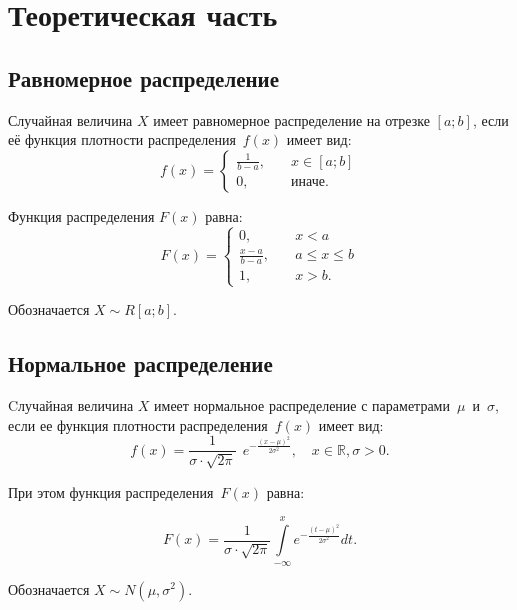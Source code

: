 \chapter{Теоретическая часть}

\section{Равномерное распределение}

Случайная величина $X$ имеет равномерное распределение на отрезке $[a; b]$, если её функция плотности распределения~$f(x)$ имеет вид:
\begin{equation}
	f(x) =
	\begin{cases}
		\frac{1}{b - a}, & \quad x \in [a; b]\\
		0,  & \quad \text{иначе}.
	\end{cases}
\end{equation}

Функция распределения $F(x)$ равна:
\begin{equation}
	F(x) =
	\begin{cases}
		0, & \quad x < a \\
		\frac{x - a}{b - a}, & \quad a \le x \le b \\
		1,  & \quad x > b.
	\end{cases}
\end{equation}

Обозначается $X \sim R[a; b]$.

\section{Нормальное распределение}

Cлучайная величина $X$ имеет нормальное распределение с параметрами~$\mu$~и~$\sigma$, если ее функция плотности распределения~$f(x)$ имеет вид:
\begin{equation}
	f(x) = \frac{1}{\sigma \cdot \sqrt{2\pi}}~~e^{\displaystyle-\frac{(x -
			\mu)^2}{2\sigma^2}}, \quad x \in \mathbb{R}, \sigma > 0.
\end{equation}

При этом функция распределения~$F(x)$ равна:

\begin{equation}
	F(x) = \frac{1}{\sigma \cdot \sqrt{2\pi}} \int\limits_{-\infty}^{x}
	e^{\displaystyle-\frac{(t - \mu)^2}{2\sigma^2}} dt.
\end{equation}

Обозначается $X \sim N(\mu, \sigma^2)$.